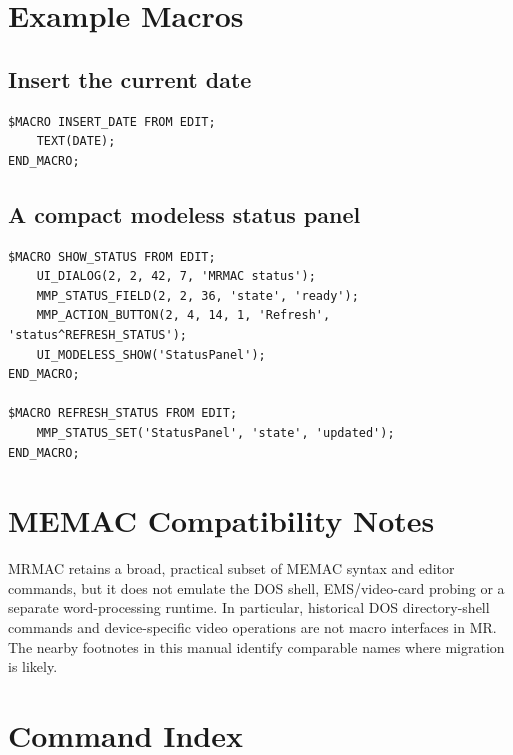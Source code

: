 \documentclass[a4paper,10pt,twoside,openany]{book}
\newenvironment{mrmacextension}{\begin{changebar}}{\end{changebar}}
\begin{document}
\chapter{Example Macros}

\section{Insert the current date}

\begin{verbatim}
$MACRO INSERT_DATE FROM EDIT;
    TEXT(DATE);
END_MACRO;
\end{verbatim}

\section{A compact modeless status panel}

\begin{mrmacextension}
\begin{verbatim}
$MACRO SHOW_STATUS FROM EDIT;
    UI_DIALOG(2, 2, 42, 7, 'MRMAC status');
    MMP_STATUS_FIELD(2, 2, 36, 'state', 'ready');
    MMP_ACTION_BUTTON(2, 4, 14, 1, 'Refresh', 'status^REFRESH_STATUS');
    UI_MODELESS_SHOW('StatusPanel');
END_MACRO;

$MACRO REFRESH_STATUS FROM EDIT;
    MMP_STATUS_SET('StatusPanel', 'state', 'updated');
END_MACRO;
\end{verbatim}
\end{mrmacextension}

\appendix
\chapter{MEMAC Compatibility Notes}

MRMAC retains a broad, practical subset of MEMAC syntax and editor commands,
but it does not emulate the DOS shell, EMS/video-card probing or a separate
word-processing runtime. In particular, historical DOS directory-shell commands
and device-specific video operations are not macro interfaces in MR. The nearby
footnotes in this manual identify comparable names where migration is likely.

\chapter{Command Index}

\printindex
\end{document}
